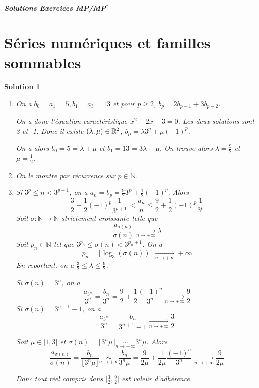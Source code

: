 \documentclass[12pt]{article}
\newtheorem{solution}{Solution}[section]
\theoremstyle{remark}
\newcommand{\N}{\mathbb{N}} \newcommand{\Z}{\mathbb{Z}}
\numberwithin{equation}{section}
\begin{document}
\begin{titlepage}
	\centering
	\vspace*{\fill}
	\Huge \textit{\textbf{Solutions Exercices MP/MP$^*$}}
	\vspace*{\fill}
\end{titlepage}

\cleardoublepage

\tableofcontents

\cleardoublepage


\section{Séries numériques et familles sommables}

\begin{solution}
	\phantom{}
	\begin{enumerate}
		\item On a $b_{0}=a_{1}=5,b_{1}=a_{3}=13$ et pour $p\geqslant2$, $b_{p}=2b_{p-1}+3b_{p-2}$.
		
		On a donc l'équation caractéristique $x^{2}-2x-3=0$. Les deux solutions sont 3 et -1. Donc il existe $(\lambda,\mu)\in\mathbb{R}^{2}$, $b_{p}=\lambda 3^{p}+\mu(-1)^{p}$.

		On a alors $b_{0}=5=\lambda+\mu$ et $b_{1}=13=3\lambda-\mu$. On trouve alors $\lambda=\frac{9}{2}$ et $\mu=\frac{1}{2}$.

		\item On le montre par récurrence sur $p\in\N$.
		
		\item Si $3^{p}\leqslant n<3^{p+1}$, on a $a_{n}=b_{p}=\frac{9}{2}3^{p}+\frac{1}{2}(-1)^{p}$.
		Alors 
		$$\frac{3}{2}+\frac{1}{2}(-1)^{p}\frac{1}{3^{p+1}}<\frac{a_{n}}{n}\leqslant\frac{9}{2}+\frac{1}{2}(-1)^{p}\frac{1}{3^{p}}$$
		Soit $\sigma\colon\N\to\N$ strictement croissante telle que 
		$$\frac{a_{\sigma(n)}}{\sigma(n)}\xrightarrow[n\to+\infty]{}\lambda$$
		Soit $p_{n}\in\N$ tel que $3^{p_{n}}\leqslant\sigma(n)<3^{p_{n}+1}$. On a 
		$$p_{n}=\bigl\lfloor\log_{3}(\sigma(n))\bigr\rfloor\xrightarrow[n\to+\infty]{}+\infty$$
		En reportant, on a $\frac{3}{2}\leqslant\lambda\leqslant\frac{9}{2}$.

		Si $\sigma(n)=3^{n}$, on a 
		$$\frac{a_{3^{n}}}{3^{n}}=\frac{b_{n}}{3^{n}}=\frac{9}{2}+\frac{1}{2}\frac{(-1)^{n}}{3^{n}}\xrightarrow[n\to+\infty]{}\frac{9}{2}$$
		Si $\sigma(n)=3^{n+1}-1$, on a 
		$$\frac{a_{3^{n}}}{3^{n}}=\frac{b_{n}}{3^{n+1}-1}\xrightarrow[n\to+\infty]{}\frac{3}{2}$$

		Soit $\mu\in[1,3[$ et $\sigma(n)=\lfloor 3^{n}\mu\rfloor\underset{n\to+\infty}{\sim}3^{n}\mu$. Alors 
		$$\frac{a_{\sigma(n)}}{\sigma(n)}=\frac{b_{n}}{\lfloor3^{n}\mu\rfloor}\underset{n\to+\infty}{\sim}\frac{b_{n}}{3^{n}\mu}=\frac{9}{2\mu}+\frac{1}{2\mu}\frac{(-1)^{n}}{3^{n}}\xrightarrow[n\to+\infty]{}\frac{9}{2\mu}$$
		
		Donc tout réel compris dans $\bigl[\frac{3}{2},\frac{9}{2}\bigr]$ est valeur d'adhérence.
	\end{enumerate}
\end{solution}
\end{document}
